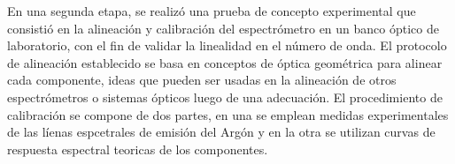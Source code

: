 En una segunda etapa, se realizó una prueba de concepto experimental que consistió en la alineación y calibración del espectrómetro en un banco óptico de laboratorio, con el fin de validar la linealidad en el número de onda. El protocolo de alineación establecido se basa en conceptos de óptica geométrica para alinear cada componente, ideas que pueden ser usadas en la alineación de otros espectrómetros o sistemas ópticos luego de una adecuación. El procedimiento de calibración se compone de dos partes, en una se emplean medidas experimentales de las líenas espcetrales de emisión del Argón y en la otra se utilizan curvas de respuesta espectral teoricas de los componentes.

\newpage

